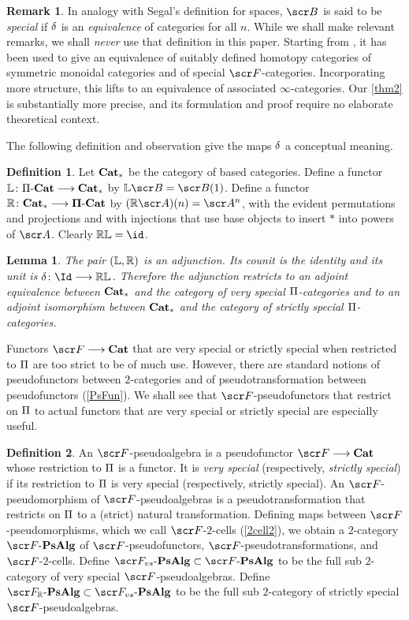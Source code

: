 \documentclass{amsart}
\newtheorem{lem}{Lemma}[section]
\theoremstyle{definition}
\newtheorem{defn}{Definition}[section]
\newtheorem{rem}{Remark}[section]
\numberwithin{equation}{section}
\newcommand{\FP}{\sF\text{-}\mathbf{PsAlg}}
\newcommand{\FPs}{\sF_{vs}\text{-}\mathbf{PsAlg}}
\newcommand{\FPR}{\sF_{\bR}\text{-}\mathbf{PsAlg}}
\begin{document}
\begin{rem}  In analogy with Segal's definition for spaces, $\sB$ is said to be {\em{special}} if $\delta$ is an {\em{equivalence}} of categories for all $n$. While we shall make relevant remarks, we shall {\em{never}} use that definition in this paper.  Starting from \cite{Arroyo}, it has been used to give an equivalence of suitably defined homotopy categories of symmetric monoidal categories and of special $\sF$-categories.  Incorporating more structure, this lifts to an equivalence of associated $\infty$-categories.  Our \autoref{thm2} is substantially more precise, and its formulation and proof require no elaborate theoretical context.
\end{rem}

The following definition and observation give the maps $\delta$ a conceptual meaning.

\begin{defn} Let $\bf{Cat}_*$ be  the category of based categories.  Define a functor $\mathbb{L} \colon \Pi\text{-}\bf{Cat} \longrightarrow \bf{Cat}_*$ by $\bL \sB = \sB(1)$.
Define a functor $\mathbb{R}\colon \bf{Cat}_* \longrightarrow \Pi\text{-}\bf{Cat}$ by $(\bR \sA)(n) = \sA^n$, with the evident permutations and projections and with injections that use base objects to insert $\ast$ into powers of $\sA$. Clearly $\bR\bL = \id$.
\end{defn}

\begin{lem}\label{LRAd} The pair $(\mathbb{L},\mathbb{R})$ is an adjunction. Its counit is the identity and its unit is $\de\colon \Id \rtarr \bR\bL$. 
Therefore the adjunction restricts to an adjoint equivalence between $\bf{Cat}_{*}$ and the category of very special $\Pi$-categories and to an adjoint isomorphism between $\bf{Cat}_{*}$ and the category of strictly special $\Pi$-categories.
\end{lem}

Functors $\sF \rtarr \bf{Cat}$ that are very special or strictly special when restricted to $\Pi$ are too strict to be of much use. However, there are standard notions of pseudofunctors between $2$-categories and of pseudotransformation  between pseudofunctors (\autoref{PsFun}).   We shall see that
$\sF$-pseudofunctors that restrict on $\Pi$ to actual functors that are very special or strictly special are 
especially useful.   

\begin{defn}\label{Fps} An $\sF$-pseudoalgebra is a pseudofunctor $\sF \rtarr  \bf{Cat}$ whose restriction to $\Pi$ is a functor.  It is {\em{very special}} (respectively, {\em{strictly special}}) if its restriction to $\Pi$ is very special (respectively, strictly special).  An $\sF$-pseudomorphism of $\sF$-pseudoalgebras is a pseudotransformation that restricts on $\Pi$ to a (strict) natural transformation. Defining maps between 
$\sF$-pseudomorphisms, which we call $\sF$-$2$-cells (\autoref{2cell2}), we obtain a $2$-category $\FP$ of $\sF$-pseudofunctors, $\sF$-pseudotransformations, and $\sF$-$2$-cells.  Define $\FPs\subset \FP$ to be the full sub $2$-category of very special $\sF$-pseudoalgebras.  Define $\FPR\subset \FPs$ to be the full sub $2$-category of strictly special $\sF$-pseudoalgebras. 
\end{defn}
\end{document}
